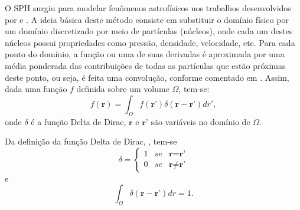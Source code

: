 O SPH surgiu para modelar fenômenos astrofísicos nos trabalhos desenvolvidos por  e . A ideia básica deste método consiste em substituir o domínio físico por um domínio discretizado por meio de partículas (núcleos), onde cada um destes núcleos possui propriedades como pressão, densidade, velocidade, etc. Para cada ponto do domínio, a função ou uma de suas derivadas é aproximada por uma média ponderada das contribuições de todas as partículas que estão próximas deste ponto, ou seja, é feita uma convolução, conforme comentado em . Assim, dada uma função $f$ definida sobre um volume $\Omega$, tem-se:
\begin{equation} \label{integral}
f(\textbf{r}) = \int_{\Omega} f(\textbf{r'})\delta(\textbf{r}-\textbf{r'})dr',
\end{equation}
onde $\delta$ é a função Delta de Dirac, $\textbf{r}$ e $\textbf{r'}$ são variáveis no domínio de $\Omega$.

Da definição da função Delta de Dirac, \cite{Queiroz}, tem-se
\begin{equation}
\delta = \left\{
\begin{array}{rcl}
1 & se & \textbf{r} = \textbf{r'}\\
0 & se & \textbf{r} \neq \textbf{r'}
\end{array} \right.
\end{equation}
e
\begin{equation}
\int_{\Omega} \delta(\textbf{r}-\textbf{r'})dr =1.
\end{equation}

